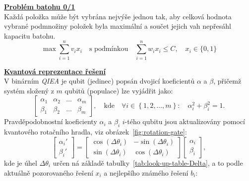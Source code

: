 {\large\underline{\textbf{Problém batohu 0/1}}} \\[0.5em]
Každá položka může být vybrána nejvýše jednou tak, aby celková hodnota vybrané podmnožiny položek byla maximální a součet jejich vah nepřesáhl kapacitu batohu.
\begin{equation}
  \max \sum_{i=1}^{n} v_i x_i
  \quad \text{s podmínkou} \quad \sum_{i=1}^{n} w_i x_i \leq C,
  \quad x_i \in \{0,1\}
\end{equation}

{\large\underline{\textbf{Kvantová reprezentace řešení}}} \\[0.5em]
V binárním \emph{QIEA} je qubit (jedinec) popsán dvojicí koeficientů $\alpha$ a $\beta$, přičemž systém složený z $m$ qubitů (populace) lze vyjádřit jako:
\label{eq:quantum-representation} 
\begin{equation}
  \begin{bmatrix}
    \alpha_1 & \alpha_2 & \dots & \alpha_m \\ \beta_1 & \beta_2 & \dots & \beta_m
  \end{bmatrix},
  \quad \text{kde} \quad \forall i \in \left\{ 1,2,\dots,m \right\}: \quad \alpha_i^2 + \beta_i^2 = 1.
\end{equation}
Pravděpodobnostní koeficienty $\alpha_i$ a $\beta_i$ $i$-tého qubitu jsou aktualizovány pomocí kvantového rotačního hradla, viz obrázek~\ref{fig:rotation-gate}:
\begin{equation}
  \label{eq:rotation-gate-angles}
  \begin{bmatrix} 
    \alpha_i' \\ 
    \beta_i'
  \end{bmatrix} = 
  \begin{bmatrix} 
    \cos{\left( \Delta\theta_i \right)} & - \sin{\left( \Delta\theta_i \right)} \\
    \sin{\left( \Delta\theta_i \right)} & \cos{\left( \Delta\theta_i \right)}
  \end{bmatrix} 
  \begin{bmatrix} 
    \alpha_i \\ 
    \beta_i 
  \end{bmatrix},
\end{equation}
kde je úhel $\Delta\theta_i$ určen ná základě tabulky~\ref{tab:look-up-table-Delta}, a to podle aktuálně pozorovaného řešení $x_i$ a nejlepšího známého řešení $b_i$:

